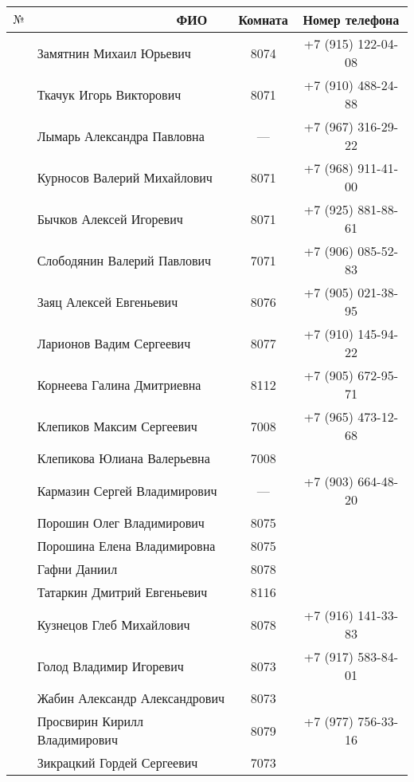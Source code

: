 \documentclass[a4paper,12pt]{article} %
\newcounter{magicrownumbers}
\newcommand\rownumber{\stepcounter{magicrownumbers}\arabic{magicrownumbers}}
\begin{document}
\pagestyle{empty}
	\begin{longtable}{r|l|c|c}
		\toprule
		$ № $ &~~~~~~~~~~~~~~~~~~~ФИО
		&Комната & Номер телефона\\ 
		\midrule
		\rownumber & Замятнин Михаил Юрьевич & 8074 & 
		+7 (915) 122-04-08 \\
		\midrule
		\rownumber & Ткачук Игорь Викторович & 8071 &
		+7 (910) 488-24-88\\
		\midrule
		\rownumber & Лымарь Александра Павловна & --- & 
		+7 (967) 316-29-22\\
		\midrule
		\rownumber & Курносов Валерий Михайлович & 8071 &
		+7 (968) 911-41-00\\
		\midrule
		\rownumber & Бычков Алексей Игоревич & 8071 &
		+7 (925) 881-88-61\\
		\midrule
		\rownumber & Слободянин Валерий Павлович & 7071 &
		+7 (906) 085-52-83\\
		\midrule
		\rownumber & Заяц Алексей Евгеньевич & 8076 &
		+7 (905) 021-38-95\\
		\midrule
		\rownumber & Ларионов Вадим Сергеевич & 8077 &
		+7 (910) 145-94-22\\
		\midrule
		\rownumber & Корнеева Галина Дмитриевна & 8112 &
		+7 (905) 672-95-71\\
		\midrule
		\rownumber & Клепиков Максим Сергеевич & 7008 &
		+7 (965) 473-12-68\\
		\midrule
		\rownumber & Клепикова Юлиана Валерьевна & 7008 &\\
		\midrule
		\rownumber & Кармазин Сергей Владимирович & --- &
		+7 (903) 664-48-20\\
		\midrule
		\rownumber & Порошин Олег Владимирович & 8075 &\\
		\midrule
		\rownumber & Порошина Елена Владимировна & 8075 &\\
		\midrule
		\rownumber & Гафни Даниил & 8078 &\\
		\midrule
		\rownumber & Татаркин Дмитрий Евгеньевич & 8116 &\\
		\midrule
		\rownumber & Кузнецов Глеб Михайлович & 8078 &
		+7 (916) 141-33-83\\
		\midrule
		\rownumber & Голод Владимир Игоревич & 8073 &
		+7 (917) 583-84-01\\
		\midrule
		\rownumber & Жабин Александр Александрович & 8073 &
		\\
		\midrule
		\rownumber & Просвирин Кирилл Владимирович & 8079 &
		+7 (977) 756-33-16\\
		\midrule
		\rownumber & Зикрацкий Гордей Сергеевич & 7073 &

\end{longtable}
\end{document}
